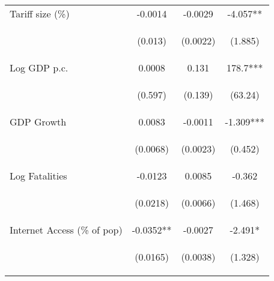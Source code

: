 \documentclass{article}
\begin{document}
\begin{table}[htbp]
{\begin{tabular}{lccc}
Tariff size (\%) & -0.0014 & -0.0029 & -4.057** \\
\vspace{4pt} & \begin{footnotesize}(0.013)\end{footnotesize} & \begin{footnotesize}(0.0022)\end{footnotesize} & \begin{footnotesize}(1.885)\end{footnotesize} \\
Log GDP p.c. & 0.0008 & 0.131 & 178.7*** \\
\vspace{4pt} & \begin{footnotesize}(0.597)\end{footnotesize} & \begin{footnotesize}(0.139)\end{footnotesize} & \begin{footnotesize}(63.24)\end{footnotesize} \\
GDP Growth & 0.0083 & -0.0011 & -1.309*** \\
\vspace{4pt} & \begin{footnotesize}(0.0068)\end{footnotesize} & \begin{footnotesize}(0.0023)\end{footnotesize} & \begin{footnotesize}(0.452)\end{footnotesize} \\
Log Fatalities & -0.0123 & 0.0085 & -0.362 \\
\vspace{4pt} & \begin{footnotesize}(0.0218)\end{footnotesize} & \begin{footnotesize}(0.0066)\end{footnotesize} & \begin{footnotesize}(1.468)\end{footnotesize} \\
Internet Access (\% of pop) & -0.0352** & -0.0027 & -2.491* \\
\vspace{4pt} & \begin{footnotesize}(0.0165)\end{footnotesize} & \begin{footnotesize}(0.0038)\end{footnotesize} & \begin{footnotesize}(1.328)\end{footnotesize} \\

\end{tabular}}
\end{table}
\end{document}
